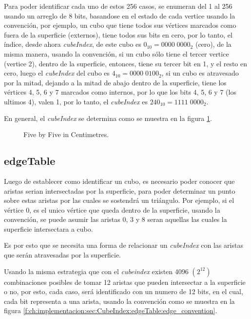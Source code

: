 Para poder identificar cada uno de estos 256 casos, se enumeran del 1 al 256 usando un arreglo de 8 bits, basandose en el estado de cada vertice usando la convención, por ejemplo, un cubo que tiene todos sus vértices marcados como fuera de la superficie (externos), tiene todos sus bits en cero, por lo tanto, el índice, desde ahora \emph{cubeIndex}, de este cubo es \hbox{$0_{10} = 0000 \; 0000_{2}$} (cero), de la misma manera, usando la convención, si un cubo sólo tiene el tercer vertice (vertice 2), dentro de la superficie, entonces, tiene su tercer bit en 1, y el resto en cero, luego el \emph{cubeIndex} del cubo es $4_{10} = 0000 \; 0100_{2}$, si un cubo es atravesado por la mitad, dejando a la mitad de abajo dentro de la superficie, tiene los vértices 4, 5, 6 y 7 marcados como internos, por lo que los bits 4, 5, 6 y 7 (los ultimos 4), valen 1, por lo tanto, el \emph{cubeIndex} es $240_{10} = 1111 \; 0000_{2}$.

En general, el \emph{cubeIndex} se determina como se muestra en la figura \ref{f:ch:implementacion:sec:CubeIndex:cubeindex:cubeindex}.

\begin{figure}[hbt]
	\makebox[\textwidth]{\framebox[0.3\textwidth]{\rule{0pt}{0.2\textwidth}}}
	\caption{Five by Five in Centimetres.}
	\label{f:ch:implementacion:sec:CubeIndex:cubeindex:cubeindex}
\end{figure}

\subsection{edgeTable}
\label{ch:implementacion:sec:edgeTable}

Luego de establecer como identificar un cubo, es necesario poder conocer que aristas serian intersectadas por la superficie, para poder determinar un punto sobre estas aristas por las cuales se sostendrá un triángulo. Por ejemplo, si el vértice $0$, es el unico vértice que queda dentro de la superficie, usando la convención, se puede asumir las aristas $0$, $3$ y $8$ seran aquellas las cuales la superficie intersectara a cubo.

Es por esto que se necesita una forma de relacionar un \emph{cubeIndex} con las aristas que serán atravesadas por la superficie.

Usando la misma estrategia que con el \emph{cubeindex} existen 4096 $(2^{12})$ combinaciones posibles de tomar 12 aristas que pueden intersectar a la superficie o no, por esto, cada caso, será identificado con un numero de 12 bits, en el cual, cada bit representa a una arista, usando la convención como se muestra en la figura \ref{f:ch:implementacion:sec:CubeIndex:edgeTable:edge_convention}.

